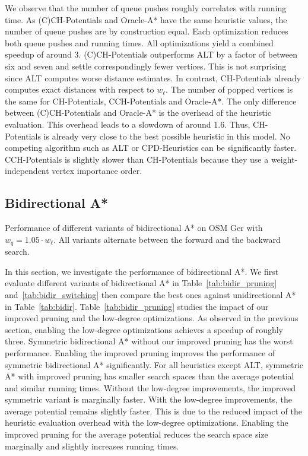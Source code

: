\documentclass[manuscript,review]{acmart}
\begin{document}
We observe that the number of queue pushes roughly correlates with running time.
As (C)CH-Potentials and Oracle-A* have the same heuristic values, the number of queue pushes are by construction equal.
Each optimization reduces both queue pushes and running times.
All optimizations yield a combined speedup of around 3.
(C)CH-Potentials outperforms ALT by a factor of between six and seven and settle correspondingly fewer vertices.
This is not surprising since ALT computes worse distance estimates.
In contrast, CH-Potentials already computes exact distances with respect to $w_\ell$.
The number of popped vertices is the same for CH-Potentials, CCH-Potentials and Oracle-A*.
The only difference between (C)CH-Potentials and Oracle-A* is the overhead of the heuristic evaluation.
This overhead leads to a slowdown of around 1.6.
Thus, CH-Potentials is already very close to the best possible heuristic in this model.
No competing algorithm such as ALT or CPD-Heuristics can be significantly faster.
CCH-Potentials is slightly slower than CH-Potentials because they use a weight-independent vertex importance order.

\subsection{Bidirectional A*}

\begin{table}
\centering
\caption{
Performance of different variants of bidirectional A* on OSM Ger with $w_q = 1.05 \cdot w_\ell$.
All variants alternate between the forward and the backward search.}
\label{tab:bidir_pruning}

\end{table}

In this section, we investigate the performance of bidirectional A*.
We first evaluate different variants of bidirectional A* in Table~\ref{tab:bidir_pruning} and~\ref{tab:bidir_switching} then compare the best ones against unidirectional A* in Table~\ref{tab:bidir}.
Table~\ref{tab:bidir_pruning} studies the impact of our improved pruning and the low-degree optimizations.
As observed in the previous section, enabling the low-degree optimizations achieves a speedup of roughly three.
Symmetric bidirectional A* without our improved pruning has the worst performance.
Enabling the improved pruning improves the performance of symmetric bidirectional A* significantly.
For all heuristics except ALT, symmetric A* with improved pruning has smaller search spaces than the average potential and similar running times.
Without the low-degree improvements, the improved symmetric variant is marginally faster.
With the low-degree improvements, the average potential remains slightly faster.
This is due to the reduced impact of the heuristic evaluation overhead with the low-degree optimizations.
Enabling the improved pruning for the average potential reduces the search space size marginally and slightly increases running times.
\end{document}
